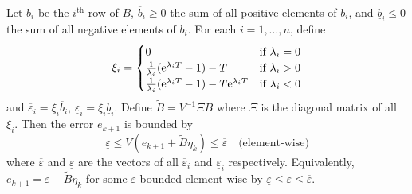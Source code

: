 \begin{theorem}
  \label{thm:averaged-sys-bound}
  Let $b_i$ be the $i^{\text{th}}$ row of $B$, $\overbar{b}_i \geqslant 0$ the sum of all positive elements of $b_i$, and $\underline{b}_i \leqslant 0$ the sum of all negative elements of $b_i$.
  For each $i = 1,\ldots,n$, define
  \[ \xi_i =
  \begin{cases}
    0 & \text{if $\lambda_{i} = 0$} \\
    \frac{1}{\lambda_i} (\mathrm{e}^{\lambda_i T} - 1) - T & \text{if $\lambda_i > 0$}\\
    \frac{1}{\lambda_i} (\mathrm{e}^{\lambda_i T} - 1) - T \mathrm{e}^{\lambda_i T} & \text{if $\lambda_i < 0$}
  \end{cases} \]
  and $\overbar{\varepsilon}_{i} = \xi_{i} \overbar{b}_{i}$, $\underline{\varepsilon}_{i} = \xi_{i} \underline{b}_{i}$.
  Define $\tilde{B} = V^{-1} \Xi B$ where $\Xi$ is the diagonal matrix of all $\xi_{i}$.
  Then the error $e_{k+1}$ is bounded by
  \begin{equation*}
    \underline{\varepsilon} \leqslant V (e_{k+1} + \tilde{B} \eta_{k}) \leqslant \overbar{\varepsilon} \quad \text{(element-wise)}
  \end{equation*}
  where $\overbar{\varepsilon}$ and $\underline{\varepsilon}$ are the vectors of all $\overbar{\varepsilon}_{i}$ and $\underline{\varepsilon}_{i}$ respectively.
  Equivalently, $e_{k+1} = \varepsilon - \tilde{B} \eta_{k}$ for some $\varepsilon$ bounded element-wise by $\underline{\varepsilon} \leqslant \varepsilon \leqslant \overbar{\varepsilon}$.
\end{theorem}



